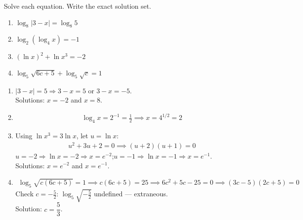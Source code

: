 \documentclass{ximera}
\begin{document}
\begin{problem}
Solve each equation. Write the exact solution set.
\begin{enumerate}
  \item[(a)] $\log_8 |3-x| = \log_8 5$
  \medskip
  \item[(b)] $\log_2 (\log_4 x) = -1$
  \medskip
  \item[(c)] $(\ln x)^2 + \ln x^3 = -2$ 
  \medskip
  \item[(d)] $\log_5 \sqrt{6c+5} + \log_5 \sqrt{c} = 1$ 
\end{enumerate}

\begin{solution}
\begin{enumerate}
  \item[(a)] $|3-x|=5 \Rightarrow 3-x=5$ or $3-x=-5$.\\
  Solutions: $\boxed{x=-2}$ and $\boxed{x=8}$.

  \item[(b)]
  \begin{align*}
    \log_4 x = 2^{-1} = \tfrac{1}{2} \implies x = 4^{1/2} = \boxed{2}
  \end{align*}

  \item[(c)] Using $\ln x^3 = 3\ln x$, let $u=\ln x$:
  \begin{align*}
    u^2+3u+2=0 \implies (u+2)(u+1)=0
  \end{align*}
  $u=-2 \Rightarrow \ln x=-2 \Rightarrow x=e^{-2}$;\quad $u=-1 \Rightarrow \ln x=-1 \Rightarrow x=e^{-1}$.\\
  Solutions: $\boxed{x=e^{-2}}$ and $\boxed{x=e^{-1}}$.

  \item[(d)]
  \begin{align*}
    \log_5\sqrt{c(6c+5)} = 1 \implies c(6c+5)=25 \implies 6c^2+5c-25=0 \implies (3c-5)(2c+5)=0
  \end{align*}
  Check $c=-\tfrac{5}{2}$: $\log_5\sqrt{-\tfrac{5}{2}}$ undefined — extraneous.\\
  Solution: $\boxed{c=\dfrac{5}{3}}$.
\end{enumerate}
\end{solution}
\end{problem}
\end{document}
